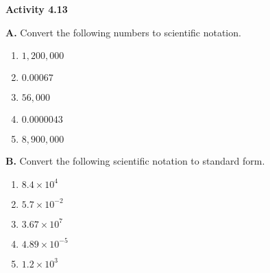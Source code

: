 \vspace{0.3ex}
\noindent\textbf{Activity 4.13}

\vspace{0.2ex}

\noindent\textbf{A.} Convert the following numbers to scientific notation.
\begin{multicols}{3}
 \begin{enumerate}
    \item \( 1,200,000 \)  
    \item \( 0.00067 \)  
    \item \( 56,000 \)  
    \item \( 0.0000043 \)  
    \item \( 8,900,000 \)  
\end{enumerate}
\end{multicols}

\noindent\textbf{B.} Convert the following scientific notation to standard form.
\begin{multicols}{3}
\begin{enumerate}
    \item \( 8.4 \times 10^4 \)  
    \item \( 5.7 \times 10^{-2} \)  
    \item \( 3.67 \times 10^7 \)  
    \item \( 4.89 \times 10^{-5} \)  
    \item \( 1.2 \times 10^3 \)  
\end{enumerate}
\end{multicols}
